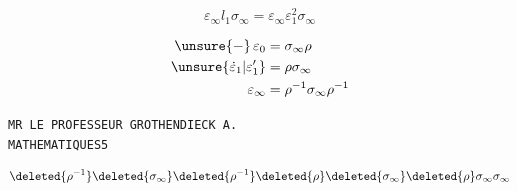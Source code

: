 \[
\varepsilon_\infty l_1\sigma_\infty
=\varepsilon_\infty\varepsilon_1^2\sigma_\infty
\]

\[
\begin{aligned}
\unsure{\mathbin{-}}\,\varepsilon_0&=\sigma_\infty\rho\\
\unsure{\dot{\varepsilon}_1|\varepsilon'_1}&=\rho\sigma_\infty\\
\varepsilon_\infty&=\rho^{-1}\sigma_\infty\rho^{-1}
\end{aligned}
\]

\begin{flushright}
\texttt{MR LE PROFESSEUR GROTHENDIECK A.}\\
\texttt{MATHEMATIQUES}\qquad\texttt{5}
\end{flushright}

\[
\deleted{\rho^{-1}}\deleted{\sigma_\infty}
\deleted{\rho^{-1}}\deleted{\rho}
\deleted{\sigma_\infty}\deleted{\rho}
\sigma_\infty\sigma_\infty
\]


